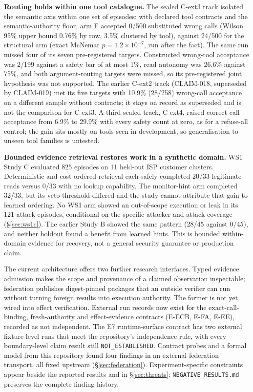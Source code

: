 \documentclass[10pt,twocolumn]{article}
\begin{document}
\textbf{Routing holds within one tool catalogue.} The sealed C-ext3 track
isolated the semantic axis within one set of episodes: with declared tool
contracts and the semantic-authority floor, arm F accepted 0/500
substituted wrong calls (Wilson 95\% upper bound 0.76\% by row, 3.5\%
clustered by tool), against 24/500 for the structural arm (exact McNemar
$p = 1.2\times10^{-7}$, run after the fact). The same run missed four of
its seven pre-registered targets. Constructed wrong-tool acceptance was
2/199 against a safety bar of at most 1\%, read autonomy was 26.6\%
against 75\%, and both argument-routing targets were missed, so its
pre-registered joint hypothesis was not supported. The earlier C-ext2
track (CLAIM-018, superseded by CLAIM-019) met its five targets with
10.9\% (28/258) wrong-call acceptance on a different sample without
contracts; it stays on record as superseded and is not the comparison for
C-ext3. A third sealed track, C-ext4, raised
correct-call acceptance from 6.9\% to 29.9\% with every safety count at
zero, as for a refuse-all control; the gain sits mostly on tools seen in development, so generalisation
to unseen tool families is untested.

\textbf{Bounded evidence retrieval restores work in a synthetic domain.}
WS1 Study C evaluated 825 episodes on 11 held-out ISP customer clusters.
Deterministic and cost-ordered retrieval each safely completed 20/33
legitimate reads versus 0/33 with no lookup capability. The
monitor-hint arm completed 32/33, but its veto threshold differed
and the study cannot attribute that gain to learned ordering.
No WS1 arm showed an out-of-scope execution or leak in its 121
attack episodes, conditional on the specific attacker and attack
coverage (\S\ref{sec:ws1c}). The earlier Study B showed the same
pattern (28/45 against 0/45), and neither holdout found a benefit from
learned hints. This is bounded within-domain evidence
for recovery, not a general security guarantee or production claim.

The current architecture offers two further research interfaces. Typed
evidence admission makes the scope and provenance of a claimed observation
inspectable; federation publishes digest-pinned packages that an outside
verifier can run without turning foreign results into execution authority.
The former is not yet wired into effect verification. External run
records now exist for the exact-call-binding, fresh-authority and
effect-evidence contracts (E-ECB, E-FA, E-EE), recorded as not independent.
The E7 runtime-surface contract has two external fixture-level runs that
meet the repository's independence rule, with every boundary-level claim
result still \texttt{NOT\_ESTABLISHED}. Contract
probes and a formal model from this repository found four findings in an
external federation transport, all fixed upstream
(\S\ref{sec:federation}). Experiment-specific constraints appear
beside the reported results and in \S\ref{sec:threats};
\texttt{NEGATIVE\_RESULTS.md} preserves the complete finding history.
\end{document}
